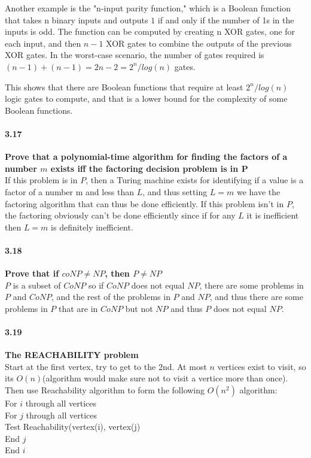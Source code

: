 Another example is the "n-input parity function," which is a Boolean function that takes n binary inputs and outputs $1$ if and only if the number of 1s in the inputs is odd. The function can be computed by creating n XOR gates, one for each input, and then $n-1$ XOR gates to combine the outputs of the previous XOR gates. In the worst-case scenario, the number of gates required is $(n-1) + (n-1) = 2n - 2 = 2^n/log(n)$ gates.

This shows that there are Boolean functions that require at least $2^n/log(n)$ logic gates to compute, and that is a lower bound for the complexity of some Boolean functions.

\paragraph{3.17} \textbf{Prove that a polynomial-time algorithm for finding the factors of a number $m$ exists iff the factoring decision problem is in P}
\\

If this problem is in $P$, then a Turing machine exists for identifying if a value is a factor of a number m and less than $L$, and thus setting $L = m$ we have the factoring algorithm that can thus be done efficiently. If this problem isn’t in $P$, the factoring obviously can’t be done efficiently since if for any $L$ it is inefficient then $L=m$ is definitely inefficient. 


\paragraph{3.18} \textbf{Prove that if $coNP \ne NP$, then $P \ne NP$}
\\

$P$ is a subset of $CoNP$ so if $CoNP$ does not equal $NP$, there are some problems in $P$ and $CoNP$, and the rest of the problems in $P$ and $NP$, and thus there are some problems in $P$ that are in $CoNP$ but not $NP$ and thus $P$ does not equal $NP$.

\paragraph{3.19} \textbf{The REACHABILITY problem}
\\

Start at the first vertex, try to get to the 2nd. At most $n$ vertices exist to visit, so its $O(n)$(algorithm would make sure not to visit a vertice more than once). 
        Then use Reachability algorithm to form the following $O(n^2)$ algorithm:
                \\ For $i$ through all vertices
                        \\ For $j$ through all vertices
                                \\ Test Reachability(vertex(i), vertex(j)
                        \\ End $j$
                \\ End $i$


